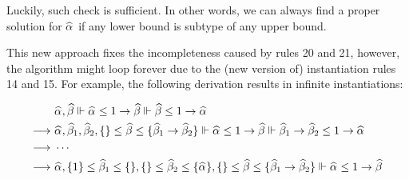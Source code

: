 Luckily, such check is sufficient. In other words,
we can always find a proper solution for $\al$ if any lower bound
is subtype of any upper bound.

This new approach fixes the incompleteness caused by rules 20 and 21,
however, the algorithm might loop forever due to the
(new version of) instantiation rules 14 and 15.
For example, the following derivation results in infinite instantiations:

\begin{gather*}
    \begin{aligned}
     & \al, \bt \Vdash \al \le 1 \to \bt \Vdash \bt \le 1 \to \al\\
\rto~& \al, \bt[1], \bt[2], \{\} \le \bt \le \{\bt[1] \to \bt[2]\}
        \Vdash \al \le 1 \to \bt \Vdash \bt[1] \to \bt[2] \le 1 \to \al\\
\rto~& \cdots\\
\rto~& \al, \{1\} \le \bt[1] \le \{\}, \{\} \le \bt[2] \le \{\al\},
        \{\} \le \bt \le \{\bt[1] \to \bt[2]\}
        \Vdash \al \le 1 \to \bt\\
    \end{aligned}
\end{gather*}

